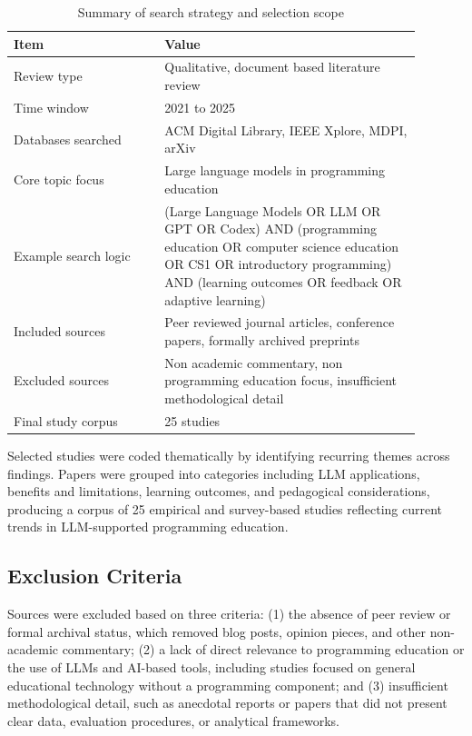 \documentclass[10pt,journal,compsoc]{IEEEtran}
\begin{document}
\begin{table}[t]
\centering
\caption{Summary of search strategy and selection scope}
\label{tab:method_summary}
\begin{tabular}{|p{0.33\linewidth}|p{0.56\linewidth}|}
\hline
Item & Value \\
\hline
Review type & Qualitative, document based literature review \\
\hline
Time window & 2021 to 2025 \\
\hline
Databases searched & ACM Digital Library, IEEE Xplore, MDPI, arXiv \\
\hline
Core topic focus & Large language models in programming education \\
\hline
Example search logic & (Large Language Models OR LLM OR GPT OR Codex) AND (programming education OR computer science education OR CS1 OR introductory programming) AND (learning outcomes OR feedback OR adaptive learning) \\
\hline
Included sources & Peer reviewed journal articles, conference papers, formally archived preprints \\
\hline
Excluded sources & Non academic commentary, non programming education focus, insufficient methodological detail \\
\hline
Final study corpus & 25 studies \\
\hline
\end{tabular}
\end{table}



Selected studies were coded thematically by identifying recurring themes across findings. Papers were grouped into categories including LLM applications, benefits and limitations, learning outcomes, and pedagogical considerations, producing a corpus of 25 empirical and survey-based studies reflecting current trends in LLM-supported programming education.

\subsection{Exclusion Criteria}
Sources were excluded based on three criteria: (1) the absence of peer review or formal archival status, which removed blog posts, opinion pieces, and other non-academic commentary; (2) a lack of direct relevance to programming education or the use of LLMs and AI-based tools, including studies focused on general educational technology without a programming component; and (3) insufficient methodological detail, such as anecdotal reports or papers that did not present clear data, evaluation procedures, or analytical frameworks.
\end{document}
